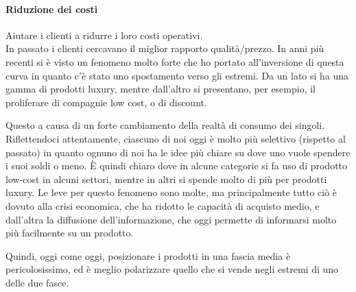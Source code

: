 \paragraph*{Riduzione dei costi} Aiutare i clienti a ridurre i loro costi
operativi.\\[0.3cm]

\noindent In passato i clienti cercavano il miglior rapporto qualità/prezzo. In
anni più recenti si è visto un fenomeno molto forte che ho portato
all'inversione di questa curva  in quanto
c'è stato uno spostamento verso gli estremi. Da un lato si ha una gamma di
prodotti luxury, mentre dall'altro si presentano, per esempio, il proliferare
di compagnie low cost, o di discount.

Questo a causa di un forte cambiamento della realtà di consumo dei singoli.
Riflettendoci attentamente, ciascuno di noi oggi è molto più selettivo
(rispetto al passato) in quanto ognuno di noi ha le idee più chiare su dove uno
vuole spendere i suoi soldi o meno. È quindi chiaro dove in alcune categorie si
fa uso di prodotto low-cost in alcuni settori, mentre in altri si spende molto
di più per prodotti luxury. Le leve per questo fenomeno sono molte, ma
principalmente tutto ciò è dovuto alla crisi economica, che ha ridotto le
capacità di acquisto medio, e dall'altra la diffusione dell'informazione, che
oggi permette di informarsi molto più facilmente su un prodotto.

Quindi, oggi come oggi, posizionare i prodotti in una fascia media è
pericolosissimo, ed è meglio polarizzare quello che si vende negli estremi di
uno delle due fasce.
